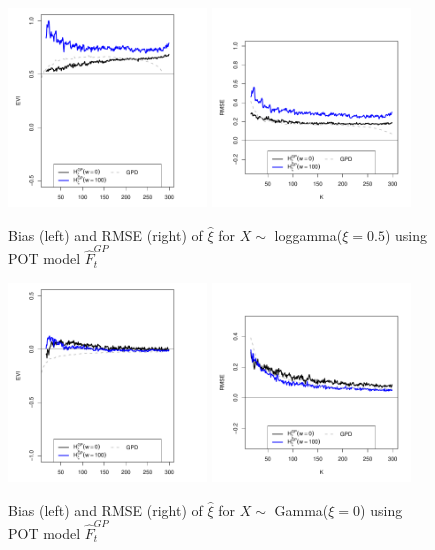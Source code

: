 \documentclass[a4paper,11pt]{article}
\begin{document}
\begin{figure}[!ht]
  \centering
  	\includegraphics[width=0.47\textwidth]{EGP_loggamma_xi_m16.pdf}
  \includegraphics[width=0.47\textwidth]{EGP_loggamma_rmse_m16.pdf} 
\caption{\small Bias (left) and RMSE (right) of $\hat{\xi}$ for $X \sim$ loggamma($\xi=0.5$) using POT model $\hat{F}^{GP}_t$} 
 \end{figure}

\begin{figure}[!ht]
	\centering
 \includegraphics[width=0.47\textwidth]{EGP_gamma_xi_m16.pdf}
\includegraphics[width=0.47\textwidth]{EGP_gamma_rmse_m16.pdf}         
	\caption{\small Bias (left) and RMSE (right) of $\hat{\xi}$ for $X \sim$ Gamma($\xi=0$) using POT model $\hat{F}^{GP}_t$} 
\end{figure}
\end{document}
